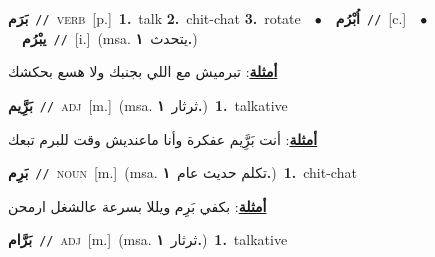 \documentclass[10pt,a4paper,twoside]{article} %
\begin{document}
\begin{multicols}{2}
{\setlength\topsep{0pt}\textbf{\foreignlanguage{arabic}{بَرَم}}\ {\color{gray}\texttt{//}\color{black}}\ \textsc{verb}\ [p.]\ \textbf{1.}~talk  \textbf{2.}~chit-chat  \textbf{3.}~rotate\ \ $\bullet$\ \ \setlength\topsep{0pt}\textbf{\foreignlanguage{arabic}{اُبْرُم}}\ {\color{gray}\texttt{//}\color{black}}\ [c.]\ \ $\bullet$\ \ \setlength\topsep{0pt}\textbf{\foreignlanguage{arabic}{يبْرُم}}\ {\color{gray}\texttt{//}\color{black}}\ [i.]\ \color{gray}(msa. \foreignlanguage{arabic}{يتحدث}~\foreignlanguage{arabic}{\textbf{١.}})\color{black}\  \begin{flushright}\color{gray}\foreignlanguage{arabic}{\textbf{\underline{\foreignlanguage{arabic}{أمثلة}}}: تبرميش مع اللي بجنبك ولا هسع بحكشك}\end{flushright}\color{black}} \vspace{2mm}

{\setlength\topsep{0pt}\textbf{\foreignlanguage{arabic}{بَرَِّيم}}\ {\color{gray}\texttt{//}\color{black}}\ \textsc{adj}\ [m.]\ \color{gray}(msa. \foreignlanguage{arabic}{ثرثار}~\foreignlanguage{arabic}{\textbf{١.}})\color{black}\ \textbf{1.}~talkative\  \begin{flushright}\color{gray}\foreignlanguage{arabic}{\textbf{\underline{\foreignlanguage{arabic}{أمثلة}}}: أنت بَرَِّيم عفكرة وأنا ماعنديش وقت للبرم تبعك}\end{flushright}\color{black}} \vspace{2mm}

{\setlength\topsep{0pt}\textbf{\foreignlanguage{arabic}{بَرِم}}\ {\color{gray}\texttt{//}\color{black}}\ \textsc{noun}\ [m.]\ \color{gray}(msa. \foreignlanguage{arabic}{تكلم حديث عام}~\foreignlanguage{arabic}{\textbf{١.}})\color{black}\ \textbf{1.}~chit-chat\  \begin{flushright}\color{gray}\foreignlanguage{arabic}{\textbf{\underline{\foreignlanguage{arabic}{أمثلة}}}: بكفي بَرِم ويللا بسرعة عالشغل ارمحن}\end{flushright}\color{black}} \vspace{2mm}

{\setlength\topsep{0pt}\textbf{\foreignlanguage{arabic}{بَرَّام}}\ {\color{gray}\texttt{//}\color{black}}\ \textsc{adj}\ [m.]\ \color{gray}(msa. \foreignlanguage{arabic}{ثرثار}~\foreignlanguage{arabic}{\textbf{١.}})\color{black}\ \textbf{1.}~talkative\ } \vspace{2mm}


\end{multicols}
\end{document}
